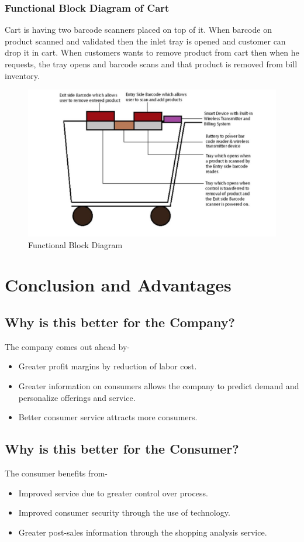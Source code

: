\documentclass[a4paper,oneside,11pt,english]{report}
\begin{document}
	\subsection{Functional Block Diagram of Cart}
	\par Cart is having two barcode scanners placed on top of it. When barcode on product scanned and validated then the inlet tray is opened and customer can drop it in cart. When customers wants to remove product from cart then when he requests, the tray opens and barcode scans and that product is removed from bill inventory.
	\begin{figure}[ht]
		\includegraphics[width=\linewidth]{images/cartlook.jpg}
		\caption{Functional Block Diagram}
	\end{figure}
	
\chapter{Conclusion and Advantages}
\section[To Company]{Why is this better for the Company? }

	The company comes out ahead by-  
	\begin{itemize}
		\item  Greater profit margins by reduction of labor cost.
		\item  Greater information on consumers allows the company to predict demand and personalize offerings and service. 
		\item  Better consumer service attracts more consumers.   
	\end{itemize}
\section[To Consumer]{Why is this better for the Consumer? }
	The consumer benefits from- 
	\begin{itemize}
		 \item Improved service due to greater control over process. 
		 \item  Improved consumer security through the use of technology. 
		 \item  Greater post-sales information through the shopping analysis service.    
	\end{itemize}
\iffalse
\end{document}
